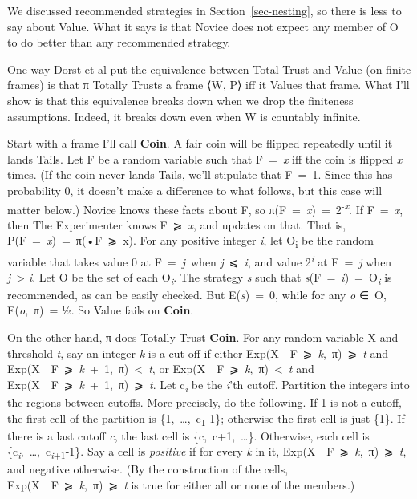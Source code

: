 \documentclass[
  10pt,
  letterpaper,
  DIV=11,
  numbers=noendperiod,
  twoside]{scrartcl}
\begin{document}
We discussed recommended strategies in Section~\ref{sec-nesting}, so
there is less to say about Value. What it says is that Novice does not
expect any member of O to do better than any recommended strategy.

One way Dorst et al put the equivalence between Total Trust and Value
(on finite frames) is that π Totally Trusts a frame ⟨W, P⟩ iff it Values
that frame. What I'll show is that this equivalence breaks down when we
drop the finiteness assumptions. Indeed, it breaks down even when W is
countably infinite.

Start with a frame I'll call \textbf{Coin}. A fair coin will be flipped
repeatedly until it lands Tails. Let F be a random variable such that
F~=~\emph{x} iff the coin is flipped \emph{x} times. (If the coin never
lands Tails, we'll stipulate that F~=~1. Since this has probability 0,
it doesn't make a difference to what follows, but this case will matter
below.) Novice knows these facts about F, so
π(F~=~\emph{x})~=~2\textsuperscript{-\emph{x}}. If F~=~\emph{x}, then
The Experimenter knows F~⩾~\emph{x}, and updates on that. That is,
P(F~=~\emph{x})~=~π(•\textbar F~⩾~x). For any positive integer \emph{i},
let O\textsubscript{i} be the random variable that takes value 0 at
F~=~\emph{j}~when \emph{j}~⩽~\emph{i}, and value
2\textsuperscript{\emph{i}} at F~=~\emph{j} when \emph{j}~\textgreater{}
\emph{i}. Let O be the set of each O\textsubscript{\emph{i}}. The
strategy \emph{s} such that
\emph{s}(F~=~\emph{i})~=~O\textsubscript{\emph{i}} is recommended, as
can be easily checked. But E(\emph{s})~=~0, while for any \emph{o} ∈~O,
E(\emph{o},~π)~= ½. So Value fails on \textbf{Coin}.

On the other hand, π does Totally Trust \textbf{Coin}. For any random
variable X and threshold \emph{t}, say an integer \emph{k} is a cut-off
if either Exp(X~\textbar~F~⩾~\emph{k},~π)~⩾~\emph{t} and
Exp(X~\textbar~F~⩾~\emph{k}~+~1,~π)~\textless~\emph{t}, or
Exp(X~\textbar~F~⩾~\emph{k},~π)~\textless~\emph{t} and
Exp(X~\textbar~F~⩾~\emph{k}~+~1,~π)~⩾~\emph{t}. Let
c\textsubscript{\emph{i}} be the \emph{i}'th cutoff. Partition the
integers into the regions between cutoffs. More precisely, do the
following. If 1 is not a cutoff, the first cell of the partition is
\{1,~\ldots,~c\textsubscript{1}-1\}; otherwise the first cell is just
\{1\}. If there is a last cutoff \emph{c}, the last cell is
\{c,~c+1,~\ldots\}. Otherwise, each cell is
\{c\textsubscript{\emph{i}},~\ldots,~c\textsubscript{\emph{i}+1}-1\}.
Say a cell is \emph{positive} if for every \emph{k} in it,
Exp(X~\textbar~F~⩾~\emph{k},~π)~⩾~\emph{t}, and negative otherwise. (By
the construction of the cells,
Exp(X~\textbar~F~⩾~\emph{k},~π)~⩾~\emph{t} is true for either all or
none of the members.)
\end{document}
